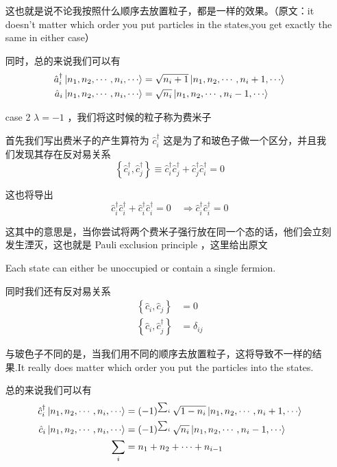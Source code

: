 \begin{example}
\begin{enumerate}
        这也就是说不论我按照什么顺序去放置粒子，都是一样的效果。（原文：it doesn’t matter which order you put particles in the states,you get exactly the same in either case）

        同时，总的来说我们可以有
        \begin{align*}
            \hat{a}_i^\dagger \ket{n_1,n_2,\cdots,n_i,\cdots} &= \sqrt{n_i + 1} \ket{n_1,n_2,\cdots,n_i +1 ,\cdots} \\
            \hat{a}_i \ket{n_1,n_2,\cdots,n_i,\cdots} &= \sqrt{n_i} \ket{n_1,n_2,\cdots,n_i -1 ,\cdots}
        \end{align*}

        \item[case 2] $\lambda = -1$ ，我们将这时候的粒子称为费米子
        
        首先我们写出费米子的产生算符为 $\hat{c}_i^\dagger$ 这是为了和玻色子做一个区分，并且我们发现其存在反对易关系
        \begin{equation*}
            \left\{\hat{c}_i^\dagger,\hat{c}_j^\dagger\right\} \equiv \hat{c}_i^\dagger \hat{c}_j^\dagger + \hat{c}_j^\dagger\hat{c}_i^\dagger = 0
        \end{equation*}
        
        这也将导出
        \begin{equation*}
            \hat{c}_i^\dagger \hat{c}_i^\dagger + \hat{c}_i^\dagger\hat{c}_i^\dagger = 0 \quad\Rightarrow \hat{c}_i^\dagger \hat{c}_i^\dagger = 0
        \end{equation*}

        这其中的意思是，当你尝试将两个费米子强行放在同一个态的话，他们会立刻发生湮灭，这也就是 Pauli exclusion principle ，这里给出原文
        \begin{theorem}
            Each state can either be unoccupied or contain a single fermion.
        \end{theorem}

        同时我们还有反对易关系
        \begin{align*}
            \left\{\hat{c}_i,\hat{c}_j\right\} &= 0 \\
            \left\{\hat{c}_i,\hat{c}_j^\dagger\right\} &= \delta_{ij}
        \end{align*}

        与玻色子不同的是，当我们用不同的顺序去放置粒子，这将导致不一样的结果.It really does matter which order you put the particles into the states.

        总的来说我们可以有
        \begin{align*}
            \hat{c}_i^\dagger \ket{n_1,n_2,\cdots,n_i,\cdots} &= \left(-1\right)^{\sum_i} \sqrt{1 - n_i} \ket{n_1,n_2,\cdots,n_i +1 ,\cdots} \\
            \hat{c}_i \ket{n_1,n_2,\cdots,n_i,\cdots} &= \left(-1\right)^{\sum_i} \sqrt{n_i} \ket{n_1,n_2,\cdots,n_i -1 ,\cdots} \\
            \sum_i &= n_1 + n_2 + \cdots + n_{i - 1}
        \end{align*}
        
    \end{enumerate}
\end{example}

